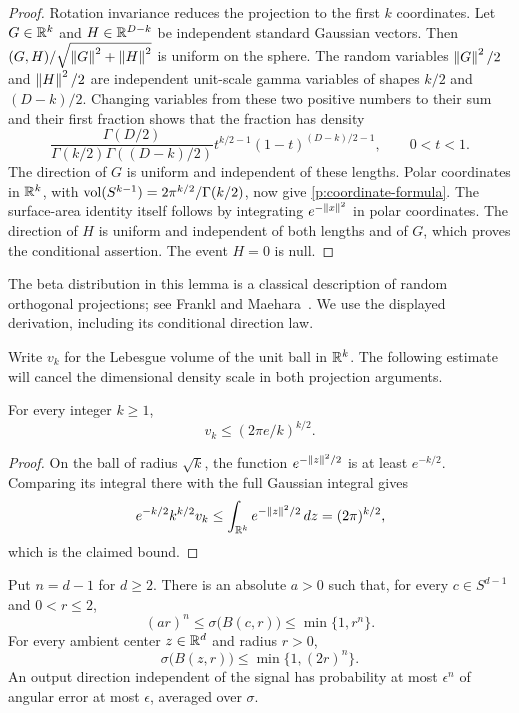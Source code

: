 \begin{proof}
Rotation invariance reduces the projection to the first \(k\) coordinates.
Let \(G\in\mathbb R^k\) and \(H\in\mathbb R^{D-k}\) be independent standard Gaussian
vectors. Then \((G,H)/\sqrt{\left\lVert G\right\rVert^2+\left\lVert H\right\rVert^2}\) is uniform on the sphere.
The random variables \(\left\lVert G\right\rVert^2/2\) and \(\left\lVert H\right\rVert^2/2\) are independent
unit-scale gamma variables of shapes \(k/2\) and \((D-k)/2\). Changing
variables from these two positive numbers to their sum and their first
fraction shows that the fraction has density
\[
 \frac{\Gamma(D/2)}
 {\Gamma(k/2)\Gamma((D-k)/2)}
 t^{k/2-1}(1-t)^{(D-k)/2-1},\qquad 0<t<1.
\]
The direction of \(G\) is uniform and independent of these lengths.
Polar coordinates in \(\mathbb R^k\), with
\(\operatorname{vol}(S^{k-1})=2\pi^{k/2}/\Gamma(k/2)\), now give
\eqref{p:coordinate-formula}. The surface-area identity itself follows by
integrating \(e^{-\left\lVert x\right\rVert^2}\) in polar coordinates. The direction of \(H\)
is uniform and independent of both lengths and of \(G\), which proves the
conditional assertion. The event \(H=0\) is null.
\end{proof}

The beta distribution in this lemma is a classical description of random
orthogonal projections; see Frankl and Maehara~\cite{FranklMaehara1990}.
We use the displayed derivation, including its conditional direction law.

Write \(v_k\) for the Lebesgue volume of the unit ball in \(\mathbb R^k\).
The following estimate will cancel the dimensional density scale in both
projection arguments.

\begin{lemma}\label{p:unit-ball-volume-lemma}
For every integer \(k\ge1\),
\begin{equation}\label{p:unit-ball-volume}
 v_k\le(2\pi e/k)^{k/2}.
\end{equation}
\end{lemma}

\begin{proof}
On the ball of radius \(\sqrt k\), the function
\(e^{-\left\lVert z\right\rVert^2/2}\) is at least \(e^{-k/2}\). Comparing its integral
there with the full Gaussian integral gives
\[
 e^{-k/2}k^{k/2}v_k
 \le\int_{\mathbb R^k}e^{-\left\lVert z\right\rVert^2/2}\,dz=(2\pi)^{k/2},
\]
which is the claimed bound.
\end{proof}

\begin{lemma}\label{p:cap-mass}
Put \(n=d-1\) for \(d\ge2\). There is an absolute \(a>0\) such that,
for every \(c\in S^{d-1}\) and \(0<r\le2\),
\begin{equation}\label{p:cap-mass-two-sided}
 (ar)^n\le \sigma\bigl(B(c,r)\bigr)\le\min\{1,r^n\}.
\end{equation}
For every ambient center \(z\in\mathbb R^d\) and radius \(r>0\),
\begin{equation}\label{p:ambient-cap-mass}
 \sigma\bigl(B(z,r)\bigr)\le\min\{1,(2r)^n\}.
\end{equation}
An output direction independent of the signal has probability at most
\(\epsilon^n\) of angular error at most \(\epsilon\), averaged over
\(\sigma\).
\end{lemma}

